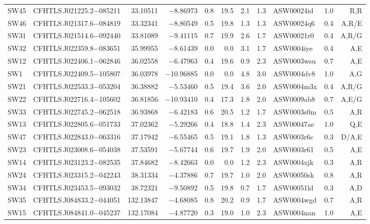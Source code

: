 \documentclass[useAMS,usenatbib,a4paper]{mn2e}
\begin{document}
\begin{center}
\begin{longtable}{llrrrrrrlrr}
SW45 & CFHTLS\,J021225.2$-$085211 &  33.10511 &  $-$8.86973 &  0.8 & 19.5 &  2.1 &  1.3 & ASW00024id &  1.0 &  R,R   \\ 
SW46 & CFHTLS\,J021317.6$-$084819 &  33.32341 &  $-$8.80549 &  0.5 & 19.8 &  1.3 &  1.3 & ASW00024q6 &  0.4 &  A,R/E   \\ 
SW31 & CFHTLS\,J021514.6$-$092440 &  33.81089 &  $-$9.41115 &  0.7 & 19.9 &  2.6 &  1.7 & ASW00021r0 &  0.4 &  A,R/G   \\ 
SW32 & CFHTLS\,J022359.8$-$083651 &  35.99955 &  $-$8.61439 &  0.0 &  0.0 &  3.1 &  1.7 & ASW0004iye &  0.4 &  A,E   \\ 
SW12 & CFHTLS\,J022406.1$-$062846 &  36.02558 &  $-$6.47963 &  0.4 & 19.6 &  0.9 &  2.3 & ASW0003wsu &  0.7 &  A,E   \\ 
SW1  & CFHTLS\,J022409.5$-$105807 &  36.03978 & $-$10.96885 &  0.0 &  0.0 &  4.8 &  3.0 & ASW0004dv8 &  1.0 &  A,G   \\ 
SW21 & CFHTLS\,J022533.3$-$053204 &  36.38882 &  $-$5.53460 &  0.5 & 19.4 &  3.6 &  2.0 & ASW0004m3x &  0.4 &  A,R/G   \\ 
SW22 & CFHTLS\,J022716.4$-$105602 &  36.81856 & $-$10.93410 &  0.4 & 17.3 &  1.8 &  2.0 & ASW0009ab8 &  0.7 &  A,E/G   \\ 
SW33 & CFHTLS\,J022745.2$-$062518 &  36.93868 &  $-$6.42183 &  0.6 & 20.5 &  1.2 &  1.7 & ASW0003s0m &  0.5 &  A,R   \\ 
SW13 & CFHTLS\,J022805.6$-$051733 &  37.02362 &  $-$5.29266 &  0.4 & 18.8 &  1.4 &  2.3 & ASW00047ae &  1.0 &  Q,E   \\ 
SW47 & CFHTLS\,J022843.0$-$063316 &  37.17942 &  $-$6.55465 &  0.5 & 19.1 &  1.8 &  1.3 & ASW0003r6c &  0.3 &  D/A,E   \\ 
SW23 & CFHTLS\,J023008.6$-$054038 &  37.53591 &  $-$5.67744 &  0.6 & 19.7 &  1.9 &  2.0 & ASW0003r61 &  0.5 &  A,E   \\ 
SW14 & CFHTLS\,J023123.2$-$082535 &  37.84682 &  $-$8.42663 &  0.0 &  0.0 &  1.2 &  2.3 & ASW0004xjk &  0.3 &  A,R   \\ 
SW24 & CFHTLS\,J023315.2$-$042243 &  38.31334 &  $-$4.37886 &  0.7 & 19.7 &  1.0 &  2.0 & ASW00050sk &  0.8 &  A,R   \\ 
SW34 & CFHTLS\,J023453.5$-$093032 &  38.72321 &  $-$9.50892 &  0.5 & 19.8 &  0.7 &  1.7 & ASW00051ld &  0.3 &  A,D   \\ 
SW35 & CFHTLS\,J084833.2$-$044051 & 132.13847 &  $-$4.68085 &  0.8 & 20.2 &  0.9 &  1.7 & ASW0004wgd &  0.7 &  A,R   \\ 
SW15 & CFHTLS\,J084841.0$-$045237 & 132.17084 &  $-$4.87720 &  0.3 & 19.0 &  1.0 &  2.3 & ASW0004nan &  1.0 &  A,E   \\ 

\end{longtable}
\end{center}
\end{document}
